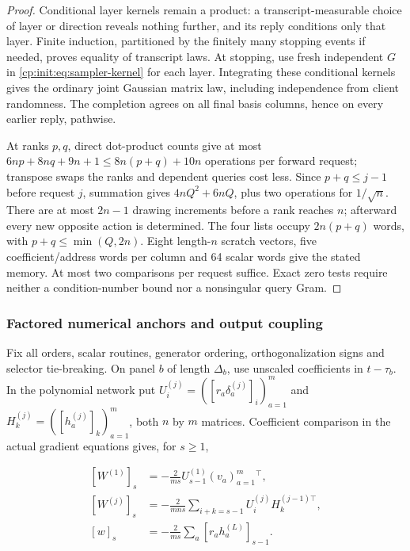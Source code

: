 \begin{proof}
Conditional layer kernels remain a product: a transcript-measurable
choice of layer or direction reveals nothing further, and its reply
conditions only that layer. Finite induction, partitioned by the finitely
many stopping events if needed, proves equality of transcript laws.
At stopping, use fresh independent $G$ in
\eqref{cp:init:eq:sampler-kernel} for each layer. Integrating these
conditional kernels gives the ordinary joint Gaussian matrix law,
including independence from client randomness. The completion agrees on
all final basis columns, hence on every earlier reply, pathwise.

At ranks $p,q$, direct dot-product counts give at most
$6np+8nq+9n+1\le8n(p+q)+10n$ operations per forward request;
transpose swaps the ranks and dependent queries cost less.
Since $p+q\le j-1$ before request $j$, summation gives
$4nQ^2+6nQ$, plus two operations for $1/\sqrt n$.
There are at most $2n-1$ drawing increments before a rank reaches $n$;
afterward every new opposite action is determined.
The four lists occupy $2n(p+q)$ words, with $p+q\le\min(Q,2n)$.
Eight length-$n$ scratch vectors, five coefficient/address words per
column and 64 scalar words give the stated memory. At most two
comparisons per request suffice. Exact zero tests require neither a
condition-number bound nor a nonsingular query Gram.
\end{proof}

\subsubsection{Factored numerical anchors and output coupling}
\label{cp:init:sec:factored-execution}

Fix all orders, scalar routines, generator ordering, orthogonalization
signs and selector tie-breaking. On panel $b$ of length $\Delta_b$,
use unscaled coefficients in $t-\tau_b$. In the polynomial network put
$U_i^{(j)}=([r_a\delta_a^{(j)}]_i)_{a=1}^m$ and
$H_k^{(j)}=([h_a^{(j)}]_k)_{a=1}^m$, both $n$ by $m$ matrices.
Coefficient comparison in the actual gradient equations gives, for $s\ge1$,

\begin{equation}
\label{cp:init:eq:factored-jets}
\begin{aligned}
[W^{(1)}]_s&=-\frac2{ms}U_{s-1}^{(1)}(v_a)_{a=1}^m{}^\top,\\
[W^{(j)}]_s&=-\frac2{mns}\sum_{i+k=s-1}U_i^{(j)}H_k^{(j-1)\top},\\
[w]_s&=-\frac2{ms}\sum_a[r_ah_a^{(L)}]_{s-1}.
\end{aligned}
\end{equation}

